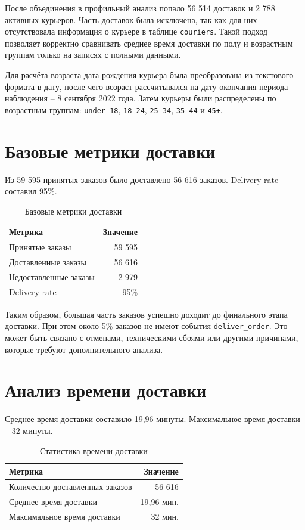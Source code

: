 \documentclass[12pt,a4paper]{article}
\begin{document}
После объединения в профильный анализ попало 56 514 доставок и 2 788 активных курьеров. Часть доставок была исключена, так как для них отсутствовала информация о курьере в таблице \texttt{couriers}. Такой подход позволяет корректно сравнивать среднее время доставки по полу и возрастным группам только на записях с полными данными.

Для расчёта возраста дата рождения курьера была преобразована из текстового формата в дату, после чего возраст рассчитывался на дату окончания периода наблюдения -- 8 сентября 2022 года. Затем курьеры были распределены по возрастным группам: \texttt{under 18}, \texttt{18--24}, \texttt{25--34}, \texttt{35--44} и \texttt{45+}.

\newpage
\section{Базовые метрики доставки}

Из 59 595 принятых заказов было доставлено 56 616 заказов. Delivery rate составил 95\%.

\begin{table}[H]
\centering
\caption{Базовые метрики доставки}
\begin{tabular}{lr}
\toprule
\textbf{Метрика} & \textbf{Значение} \\
\midrule
Принятые заказы & 59 595 \\
Доставленные заказы & 56 616 \\
Недоставленные заказы & 2 979 \\
Delivery rate & 95\% \\
\bottomrule
\end{tabular}
\end{table}

Таким образом, большая часть заказов успешно доходит до финального этапа доставки. При этом около 5\% заказов не имеют события \texttt{deliver\_order}. Это может быть связано с отменами, техническими сбоями или другими причинами, которые требуют дополнительного анализа.

\section{Анализ времени доставки}

Среднее время доставки составило 19,96 минуты. Максимальное время доставки -- 32 минуты.

\begin{table}[H]
\centering
\caption{Статистика времени доставки}
\begin{tabular}{lr}
\toprule
\textbf{Метрика} & \textbf{Значение} \\
\midrule
Количество доставленных заказов & 56 616 \\
Среднее время доставки & 19,96 мин. \\
Максимальное время доставки & 32 мин. \\
\bottomrule
\end{tabular}
\end{table}
\end{document}

